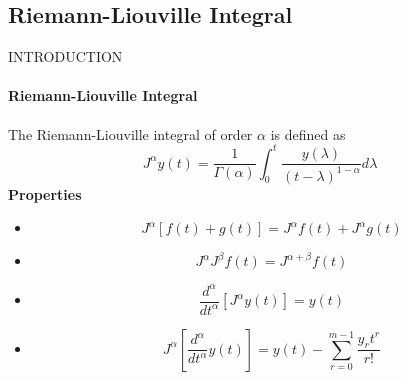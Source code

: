 \subsection{Riemann-Liouville Integral}
\begin{frame}{INTRODUCTION}
\framesubtitle{Riemann-Liouville Integral}
The Riemann-Liouville integral of order $\alpha$ is defined as
\begin{equation}
    J^\alpha y(t) = \dfrac{1}{\Gamma(\alpha)}\int_{0}^{t}\dfrac{y(\lambda)}{(t-\lambda)^{1-\alpha}}d\lambda
\end{equation}
\textbf{Properties}\\\vspace{0.5cm}
\begin{itemize}
    \item
    \begin{equation}
        J^{\alpha}\left[f(t)+g(t)\right]=J^\alpha f(t)+J^\alpha g(t)
    \end{equation}
    \item \begin{equation}
        J^\alpha J^\beta f(t) = J^{\alpha+\beta} f(t)
    \end{equation}
    \item \begin{equation}
        \dfrac{d^\alpha}{dt^\alpha}\left[ J^\alpha y(t)\right] = y(t)
    \end{equation}
    \item \begin{equation}
            J^\alpha \left[ \dfrac{d^\alpha}{dt^\alpha}y(t)\right] = y(t) - \sum_{r=0}^{m-1}\dfrac{y_rt^r}{r!}
        \end{equation}
\end{itemize}
\end{frame}



